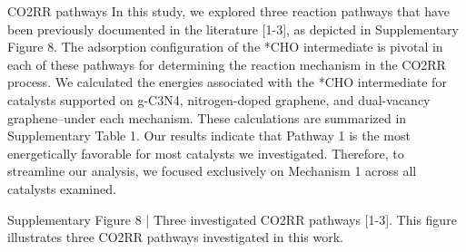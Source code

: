 CO2RR pathways
In this study, we explored three reaction pathways that have been previously documented in the literature [1-3], as depicted in Supplementary Figure 8. The adsorption configuration of the *CHO intermediate is pivotal in each of these pathways for determining the reaction mechanism in the CO2RR process. We calculated the energies associated with the *CHO intermediate for catalysts supported on g-C3N4, nitrogen-doped graphene, and dual-vacancy graphene–under each mechanism. These calculations are summarized in Supplementary Table 1. Our results indicate that Pathway 1 is the most energetically favorable for most catalysts we investigated. Therefore, to streamline our analysis, we focused exclusively on Mechanism 1 across all catalysts examined.

Supplementary Figure 8 | Three investigated CO2RR pathways [1-3]. This figure illustrates three CO2RR pathways investigated in this work.

